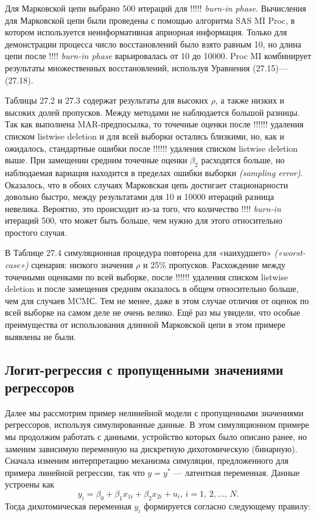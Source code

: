 Для Марковской цепи выбрано 500 итераций для !!!!! \emph{burn-in phase}. Вычисления для Марковской цепи были проведены с помощью алгоритма SAS MI Proc, в котором используется неинформативная априорная информация. Только для демонстрации процесса число восстановлений было взято равным 10, но длина цепи после !!!! \emph{burn-in phase} варьировалась от 10 до 10000. Proc MI комбинирует результаты множественных восстановлений, используя Уравнения (27.15)—(27.18).

Таблицы 27.2 и 27.3 содержат результаты для высоких $\rho$, а также низких и высоких долей пропусков. Между методами не наблюдается большой разницы. Так как выполнена MAR-предпосылка, то точечные оценки после !!!!!! удаления списком listwise deletion и для всей выборки остались близкими, но, как и ожидалось, стандартные ошибки после !!!!!! удаления списком listwise deletion выше. При замещении средним точечные оценки $\beta_2$ расходятся больше, но наблюдаемая вариация находится в пределах ошибки выборки \emph{(sampling error)}. Оказалось, что в обоих случаях Марковская цепь достигает стационарности довольно быстро, между результатами для 10 и 10000 итераций разница невелика. Вероятно, это происходит из-за того, что количество !!!! \emph{burn-in} итераций 500, что может быть больше, чем нужно для этого относительно простого случая.

В Таблице 27.4 симуляционная процедура повторена для «наихудшего» \emph{(«worst-case»)} сценария: низкого значения $\rho$ и 25\% пропусков. Расхождение между точечными оценками по всей выборке, после !!!!!! удаления списком listwise deletion и после замещения средним оказалось в общем относительно больше, чем для случаев MCMС. Тем не менее, даже в этом случае отличия от оценок по всей выборке на самом деле не очень велико. Ещё раз мы увидели, что особые преимущества от использования длинной Марковской цепи в этом примере выявлены не были.



\subsection{Логит-регрессия с пропущенными значениями регрессоров} 
Далее мы рассмотрим пример нелинейной модели с пропущенными значениями регрессоров, используя симулированные данные. В этом симуляционном примере мы продолжим работать с данными, устройство которых было описано ранее, но заменим зависимую переменную на дискретную дихотомическую (бинарную). Сначала изменим интерпретацию механизма симуляции, предложенного для примера линейной регрессии, так что $y=y^*$ --- латентная переменная. Данные устроены как
\begin{equation}
y_i=\beta_0+\beta_1 x_{1i}+\beta_2 x_{2i}+u_i, \, i=1, \, 2, \dots , \, N.
\end{equation}
Тогда дихотомическая переменная $y_i$ формируется согласно следующему правилу:



